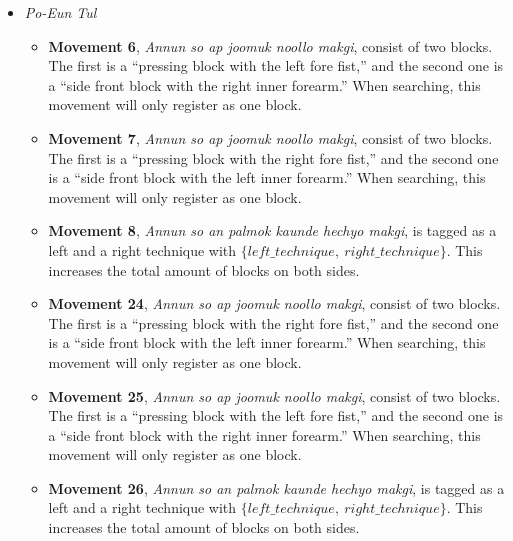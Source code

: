 \documentclass[10pt,twocolumn,a4paper]{article}
\begin{document}
\begin{itemize}
\begin{itemize}
        {\bf Movement 31}, \emph{Gunnun so sang sewo jirugi}, is tagged as a
        left and right technique, with $\{left\_technique, \:
        right\_technique\}$. This increases the total amount of punches on
        both sides.
      \item
        {\bf Movement 32}, \emph{Gunnun so sang joomuk dwijibo jirugi}, is
        tagged as a left and right technique, with $\{left\_technique, \:
        right\_technique\}$. This increases the total amount of punches on
        both sides.
      \item
        {\bf Movement 36}, \emph{Gunnun so sang joomuk dwijibo jirugi}, is
        tagged as a left and right technique, with $\{left\_technique, \:
        right\_technique\}$. This increases the total amount of punches on
        both sides.
    \end{itemize}
  \item
    \emph{Po-Eun Tul}
    \begin{itemize}
      \item
        {\bf Movement 6}, \emph{Annun so ap joomuk noollo makgi}, consist of
        two blocks. The first is a ``pressing block with the left fore fist,''
        and the second one is a ``side front block with the right inner
        forearm.'' When searching, this movement will only register as one
        block.
      \item
        {\bf Movement 7}, \emph{Annun so ap joomuk noollo makgi}, consist of
        two blocks. The first is a ``pressing block with the right fore
        fist,'' and the second one is a ``side front block with the left inner
        forearm.'' When searching, this movement will only register as one
        block.
      \item
        {\bf Movement 8}, \emph{Annun so an palmok kaunde hechyo makgi}, is
        tagged as a left and a right technique with $\{left\_technique, \:
        right\_technique\}$. This increases the total amount of blocks on both
        sides.
      \item
        {\bf Movement 24}, \emph{Annun so ap joomuk noollo makgi}, consist of
        two blocks. The first is a ``pressing block with the right fore
        fist,'' and the second one is a ``side front block with the left inner
        forearm.'' When searching, this movement will only register as one
        block.
      \item
        {\bf Movement 25}, \emph{Annun so ap joomuk noollo makgi}, consist of
        two blocks. The first is a ``pressing block with the left fore fist,''
        and the second one is a ``side front block with the right inner
        forearm.'' When searching, this movement will only register as one
        block.
      \item
        {\bf Movement 26}, \emph{Annun so an palmok kaunde hechyo makgi}, is
        tagged as a left and a right technique with $\{left\_technique, \:
        right\_technique\}$. This increases the total amount of blocks on both
        sides.
    \end{itemize}


\end{itemize}
\end{document}

